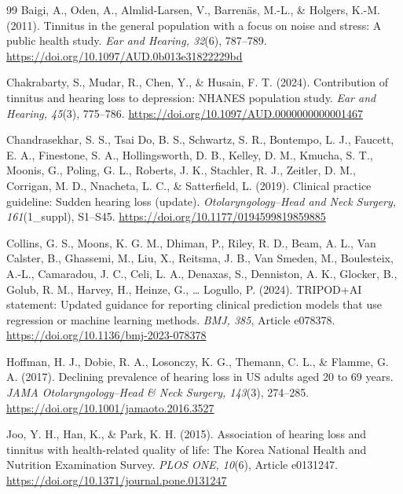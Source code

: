 \begin{thebibliography}{99}
 Baigi, A., Oden, A., Almlid-Larsen, V., Barren\"as, M.-L., \& Holgers, K.-M. (2011). Tinnitus in the general population with a focus on noise and stress: A public health study. \textit{Ear and Hearing, 32}(6), 787--789. \url{https://doi.org/10.1097/AUD.0b013e31822229bd}

 Chakrabarty, S., Mudar, R., Chen, Y., \& Husain, F. T. (2024). Contribution of tinnitus and hearing loss to depression: NHANES population study. \textit{Ear and Hearing, 45}(3), 775--786. \url{https://doi.org/10.1097/AUD.0000000000001467}

 Chandrasekhar, S. S., Tsai Do, B. S., Schwartz, S. R., Bontempo, L. J., Faucett, E. A., Finestone, S. A., Hollingsworth, D. B., Kelley, D. M., Kmucha, S. T., Moonis, G., Poling, G. L., Roberts, J. K., Stachler, R. J., Zeitler, D. M., Corrigan, M. D., Nnacheta, L. C., \& Satterfield, L. (2019). Clinical practice guideline: Sudden hearing loss (update). \textit{Otolaryngology--Head and Neck Surgery, 161}(1\_suppl), S1--S45. \url{https://doi.org/10.1177/0194599819859885}

 Collins, G. S., Moons, K. G. M., Dhiman, P., Riley, R. D., Beam, A. L., Van Calster, B., Ghassemi, M., Liu, X., Reitsma, J. B., Van Smeden, M., Boulesteix, A.-L., Camaradou, J. C., Celi, L. A., Denaxas, S., Denniston, A. K., Glocker, B., Golub, R. M., Harvey, H., Heinze, G., \ldots{} Logullo, P. (2024). TRIPOD+AI statement: Updated guidance for reporting clinical prediction models that use regression or machine learning methods. \textit{BMJ, 385}, Article e078378. \url{https://doi.org/10.1136/bmj-2023-078378}

 Hoffman, H. J., Dobie, R. A., Losonczy, K. G., Themann, C. L., \& Flamme, G. A. (2017). Declining prevalence of hearing loss in US adults aged 20 to 69 years. \textit{JAMA Otolaryngology--Head \& Neck Surgery, 143}(3), 274--285. \url{https://doi.org/10.1001/jamaoto.2016.3527}

 Joo, Y. H., Han, K., \& Park, K. H. (2015). Association of hearing loss and tinnitus with health-related quality of life: The Korea National Health and Nutrition Examination Survey. \textit{PLOS ONE, 10}(6), Article e0131247. \url{https://doi.org/10.1371/journal.pone.0131247}


\end{thebibliography}
